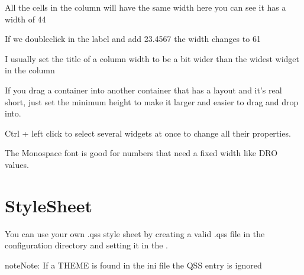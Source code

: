 \documentclass[letterpaper,10pt,english]{sphinxmanual}
\begin{document}
\sphinxAtStartPar
All the cells in the column will have the same width \sphinxhyphen{} here you can see it has a
width of 44


\sphinxAtStartPar
If we double\sphinxhyphen{}click in the label and add \sphinxhyphen{}23.4567 the width changes to 61


\sphinxAtStartPar
I usually set the title of a column width to be a bit wider than the widest
widget in the column


\sphinxAtStartPar
If you drag a container into another container that has a layout and it’s real
short, just set the minimum height to make it larger and easier to drag and drop
into.

\sphinxAtStartPar
Ctrl + left click to select several widgets at once to change all their
properties.

\sphinxAtStartPar
The Monospace font is good for numbers that need a fixed width like DRO values.

\sphinxstepscope


\chapter{StyleSheet}
\label{\detokenize{style:stylesheet}}\label{\detokenize{style::doc}}
\sphinxAtStartPar
You can use your own .qss style sheet by creating a valid .qss file in the
configuration directory and setting it in the {\hyperref[\detokenize{ini::doc}]{}}.

\begin{sphinxVerbatim}[commandchars=\\\{\}]
\PYG{p}{[}\PYG{p}{]}
  
\end{sphinxVerbatim}

\begin{sphinxadmonition}{note}{Note:}
\sphinxAtStartPar
If a THEME is found in the ini file the QSS entry is ignored
\end{sphinxadmonition}
\end{document}
